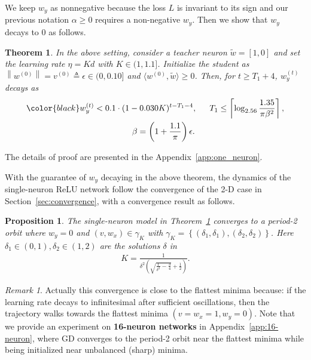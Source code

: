 \documentclass{article}
\theoremstyle{plain}
\newtheorem{theorem}{Theorem}
\newtheorem{prop}{Proposition}
\theoremstyle{remark}
\newtheorem*{remark}{Remark}
\newcommand{\red}[1]{{\color{black}#1}}
\newcommand{\norm}[1]{\left\lVert#1\right\rVert}
\newcommand{\inprod}[2]{\langle #1,#2 \rangle}
\begin{document}
We keep $w_y$ as nonnegative because the loss $L$ is invariant to its sign and our previous notation $\alpha\ge0$ requires a non-negative $w_y$. 
Then we show that $w_y$ decays to 0 as follows.

\begin{theorem}
In the above setting, consider a teacher neuron $\tilde{w}=[1,0]$ and set the learning rate $\eta=Kd$ with $K\in(1,1.1]$. Initialize the student as $\norm{w^{(0)}}=v^{(0)}\triangleq \epsilon\in(0,0.10]$ and $\inprod{w^{(0)}}{ \tilde{w}}\ge0$. Then, for $t\ge T_1 + 4$, $w_y^{(t)}$ decays as 
\begin{gather*}
    \red{w_y^{(t)} < 0.1\cdot (1-0.030K)^{t-T_1-4},}
    ~~~~~
    T_1 \le \left\lceil\log_{2.56}\frac{1.35}{\pi \beta^2}\right\rceil,
    \\
    ~~~~~~
    \beta = \left(1+\frac{1.1}{\pi}\right)\epsilon.
\end{gather*}
\label{thm:one_neuron}
\end{theorem}
\vspace{-10pt}

The details of proof are presented in the Appendix~\ref{app:one_neuron}.


With the guarantee of $w_y$ decaying in the above theorem, the dynamics of the single-neuron ReLU network follow the convergence of the 2-D case in Section~\ref{sec:convergence}, with a convergence result as follows. 
\begin{prop}
    The single-neuron model in Theorem~\ref{thm:one_neuron} converges to a period-2 orbit where $w_y=0$ and $(v,w_x)\in\gamma_K$ with $\gamma_K=\left\{(\delta_1, \delta_1), (\delta_2, \delta_2)\right\}$. Here $\delta_1\in(0,1), \delta_2\in(1,2)$ are the solutions $\delta$ in
    \begin{align}
        K  = \frac{1}{\delta^2\left( \sqrt{\frac{1}{\delta^2}-\frac{3}{4}} +\frac{1}{2}\right)}.
    \end{align}
\label{prop:single_neuron}
\end{prop}
\begin{remark}
    Actually this convergence is close to the flattest minima because: if the learning rate decays to infinitesimal after sufficient oscillations, then the trajectory walks towards the flattest minima $(v=w_x=1,w_y=0)$. Note that we provide an experiment on \textbf{16-neuron networks} in Appendix~\ref{app:16-neuron}, where GD converges to the period-2 orbit near the flattest minima while being initialized near unbalanced (sharp) minima.
\end{remark}
\end{document}

